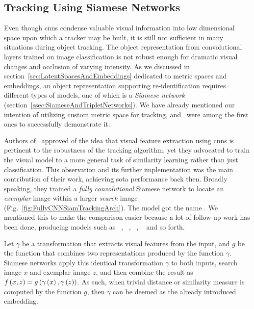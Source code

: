 \subsection{Tracking Using Siamese Networks}
\label{ssec:TrackingUsingSiameseNetworks}

Even though \glspl{cnn} condense valuable visual information into low dimensional space upon which a tracker may be built, it is still not sufficient in many situations during object tracking. The object representation from convolutional layers trained on image classification is not robust enough for dramatic visual changes and occlusion of varying intensity. As we discussed in section~\ref{sec:LatentSpacesAndEmbeddings} dedicated to metric spaces and embeddings, an object representation supporting re-identification requires different types of models, one of which is a \emph{Siamese network} (section~\ref{ssec:SiameseAndTripletNetworks}). We have already mentioned our intention of utilizing custom metric space for tracking, and~\cite{Bertinetto2016} were among the first ones to successfully demonstrate it.

Authors of~\cite{Bertinetto2016} approved of the idea that visual feature extraction using \glspl{cnn} is pertinent to the robustness of the tracking algorithm, yet they advocated to train the visual model to a more general task of similarity learning rather than just classification. This observation and its further implementation was the main contribution of their work, achieving \gls{sota} performance back then. Broadly speaking, they trained a \emph{fully convolutional} Siamese network to locate an \emph{exemplar} image within a larger \emph{search} image (Fig.~\ref{fig:FullyCNNSiamTrackingArch}). The model got the name . We mentioned this to make the comparison easier because a lot of follow-up work has been done, producing models such as ~\cite{He2018}, ~\cite{Li2018}, ~\cite{Wang2019}, ~\cite{Chen2019} and so forth.

Let $\gamma$ be a transformation that extracts visual features from the input, and $g$ be the function that combines two representations produced by the function $\gamma$. Siamese networks apply this identical transformation $\gamma$ to both inputs, search image $x$ and exemplar image $z$, and then combine the result as ${f} \left( x, z \right) = {g} \left( {\gamma} \left( x \right), {\gamma} \left( z \right) \right)$. As such, when trivial distance or similarity measure is computed by the function $g$, then $\gamma$ can be deemed as the already introduced embedding.

